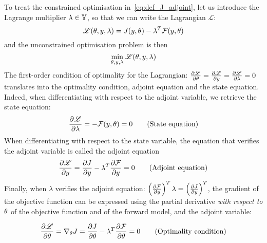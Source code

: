 \documentclass[../../Main_ManuscritThese.tex]{subfiles}
\begin{document}
To treat the constrained optimisation in~\cref{eq:def_J_adjoint}, let us introduce the Lagrange multiplier $\lambda \in \mathbb{Y}$, so that we can write the Lagrangian $\mathscr{L}$:
\begin{equation}
  \mathscr{L}(\theta, y, \lambda) = J(y,\theta) - \lambda^T \mathcal{F}(y, \theta)
\end{equation}
and the unconstrained optimisation problem is then
\begin{equation}
  \min_{\theta,y,\lambda} \mathscr{L}(\theta,y,\lambda)
\end{equation}
The first-order condition of optimality for the Lagrangian:
$\frac{\partial \mathscr{L}}{\partial \theta} = \frac{\partial \mathscr{L}}{\partial y} =
\frac{\partial \mathscr{L}}{\partial \lambda} = 0$ translates into the optimality
condition, adjoint equation and the state equation. Indeed, when
differentiating with respect to the adjoint variable, we retrieve the
state equation:
\begin{equation}
  \frac{\partial \mathscr{L}}{\partial \lambda} = - \mathcal{F}(y,\theta) = 0 \tag{State equation}
\end{equation}
When differentiating with respect to the state variable, the equation that verifies the adjoint variable is called the adjoint equation
\begin{equation}
  \frac{\partial \mathscr{L}}{\partial y} = \frac{\partial J}{\partial y} - \lambda^T \frac{\partial \mathcal{F}}{\partial y}= 0  \tag{Adjoint equation}
\end{equation}
Finally, when $\lambda$ verifies the adjoint equation: $ \left(\frac{\partial \mathcal{F}}{\partial y}\right)^T\lambda= \left(\frac{\partial J}{\partial y}\right)^T$, the gradient of the objective function can be expressed using the partial derivative \emph{with respect to $\theta$} of the objective function and of the forward model, and the adjoint variable:

\begin{equation}
    \pfrac{\mathscr{L}}{\kk} = \nabla_\kk J %
                               = \pfrac{J}{\kk} - \innerprod{\lambda}{\pfrac{\mathcal{F}}{\kk}} = 0 \tag{Optimality condition}
\end{equation}
\end{document}
